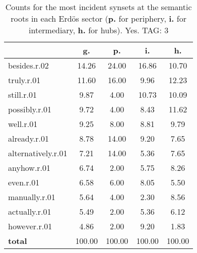 \begin{table}[h!]
\begin{center}
\begin{tabular}{| l | c | c | c | c |}\hline
 & g. & p. & i. & h. \\\hline
besides.r.02 & 14.26  & 24.00  & 16.86  & 10.70 \\\hline
truly.r.01 & 11.60  & 16.00  & 9.96  & 12.23 \\\hline
still.r.01 & 9.87  & 4.00  & 10.73  & 10.09 \\\hline
possibly.r.01 & 9.72  & 4.00  & 8.43  & 11.62 \\\hline
well.r.01 & 9.25  & 8.00  & 8.81  & 9.79 \\\hline
already.r.01 & 8.78  & 14.00  & 9.20  & 7.65 \\\hline
alternatively.r.01 & 7.21  & 14.00  & 5.36  & 7.65 \\\hline
anyhow.r.01 & 6.74  & 2.00  & 5.75  & 8.26 \\\hline
even.r.01 & 6.58  & 6.00  & 8.05  & 5.50 \\\hline
manually.r.01 & 5.64  & 4.00  & 2.30  & 8.56 \\\hline
actually.r.01 & 5.49  & 2.00  & 5.36  & 6.12 \\\hline
however.r.01 & 4.86  & 2.00  & 9.20  & 1.83 \\\hline
{{\bf total}} & 100.00  & 100.00  & 100.00  & 100.00 \\\hline
\end{tabular}
\caption{Counts for the most incident synsets at the semantic roots in each Erd\"os sector ({\bf p.} for periphery, {\bf i.} for intermediary, {\bf h.} for hubs). Yes. TAG: 3}
\end{center}
\end{table}